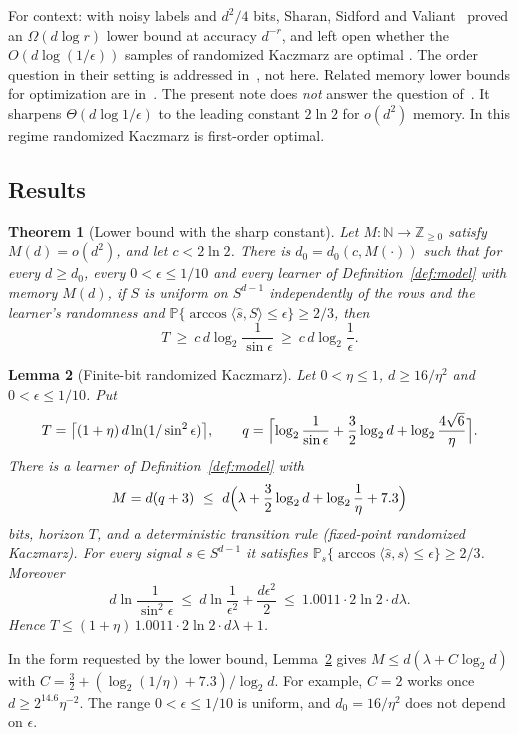 \documentclass[11pt]{article}
\newtheorem{theorem}{Theorem}
\newtheorem{lemma}[theorem]{Lemma}
\theoremstyle{definition}
\theoremstyle{remark}
\newcommand{\Prob}{\mathbb P}
\newcommand{\ip}[2]{\langle #1,#2\rangle}
\begin{document}
For context: with noisy labels and \(d^2/4\) bits, Sharan, Sidford and
Valiant~\cite{SSV19} proved an \(\Omega(d\log r)\) lower bound at
accuracy \(d^{-r}\), and left open whether the \(O(d\log(1/\epsilon))\) samples of randomized Kaczmarz are optimal \cite[\S1.1]{SSV19}. The order
question in their setting is addressed in~\cite{OAImem}, not here. Related
memory lower bounds for optimization are in~\cite{MSSV22,BZJ23}. The present
note does \emph{not} answer the question of~\cite{SSV19}. It sharpens
\(\Theta(d\log 1/\epsilon)\) to the leading constant \(2\ln 2\) for
\(o(d^2)\) memory. In this regime randomized Kaczmarz is first-order optimal.

\subsection{Results}

\begin{theorem}[Lower bound with the sharp constant]\label{thm:main}
Let \(M:\mathbb N\to\mathbb Z_{\ge0}\) satisfy \(M(d)=o(d^2)\), and let
\(c<2\ln2\). There is \(d_0=d_0(c,M(\cdot))\) such that for every
\(d\ge d_0\), every \(0<\epsilon\le 1/10\) and every learner of
Definition~\ref{def:model} with memory \(M(d)\), if \(S\) is uniform on
\(S^{d-1}\) independently of the rows and the learner's randomness and
\(\Prob\{\arccos\ip{\widehat s}{S}\le\epsilon\}\ge 2/3\), then
\[
 T\ \ge\ c\,d\log_2\frac1{\sin\epsilon}\ \ge\ c\,d\log_2\frac1\epsilon .
\]
\end{theorem}

\begin{lemma}[Finite-bit randomized Kaczmarz]\label{lem:kacz}
Let \(0<\eta\le1\), \(d\ge16/\eta^2\) and \(0<\epsilon\le1/10\). Put
\[
 T=\bigl\lceil(1+\eta)\,d\ln(1/\sin^2\epsilon)\bigr\rceil,\qquad
 q=\Bigl\lceil\log_2\frac1{\sin\epsilon}+\frac32\log_2 d+\log_2\frac{4\sqrt6}{\eta}\Bigr\rceil .
\]
There is a learner of Definition~\ref{def:model} with
\[
 M=d(q+3)\ \le\ d\Bigl(\lambda+\frac32\log_2 d+\log_2\frac1\eta+7.3\Bigr)
\]
bits, horizon \(T\), and a deterministic transition rule (fixed-point
randomized Kaczmarz). For \emph{every} signal \(s\in S^{d-1}\) it
satisfies \(\Prob_s\{\arccos\ip{\widehat s}{s}\le\epsilon\}\ge 2/3\).
Moreover
\[
 d\ln\frac1{\sin^2\epsilon}\ \le\ d\ln\frac1{\epsilon^2}+\frac{d\epsilon^2}{2}
 \ \le\ 1.0011\cdot 2\ln 2\cdot d\lambda .
\]
Hence \(T\le(1+\eta)\,1.0011\cdot 2\ln2\cdot d\lambda+1\).
\end{lemma}

In the form requested by the lower bound, Lemma~\ref{lem:kacz} gives
\(M\le d(\lambda+C\log_2 d)\) with
\(C=\tfrac32+(\log_2(1/\eta)+7.3)/\log_2 d\). For example, \(C=2\)
works once \(d\ge 2^{14.6}\eta^{-2}\). The range \(0<\epsilon\le 1/10\) is
uniform, and \(d_0=16/\eta^2\) does not depend on \(\epsilon\).
\end{document}
